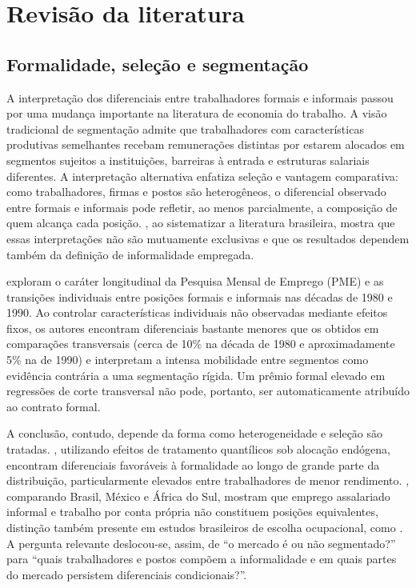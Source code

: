 \documentclass[12pt,a4paper]{article}
\begin{document}
\section{Revisão da literatura}
\label{sec:literatura}

\subsection{Formalidade, seleção e segmentação}

A interpretação dos diferenciais entre trabalhadores formais e informais passou por uma
mudança importante na literatura de economia do trabalho. A visão tradicional de
segmentação admite que trabalhadores com características produtivas semelhantes recebam
remunerações distintas por estarem alocados em segmentos sujeitos a instituições,
barreiras à entrada e estruturas salariais diferentes. A interpretação alternativa
enfatiza seleção e vantagem comparativa: como trabalhadores, firmas e postos são
heterogêneos, o diferencial observado entre formais e informais pode refletir, ao menos
parcialmente, a composição de quem alcança cada posição. \citet{ulyssea2006}, ao
sistematizar a literatura brasileira, mostra que essas interpretações não são mutuamente
exclusivas e que os resultados dependem também da definição de informalidade empregada.

\citet{curi2006} exploram o caráter longitudinal da Pesquisa Mensal de Emprego (PME) e as
transições individuais entre posições formais e informais nas décadas de 1980 e 1990. Ao
controlar características individuais não observadas mediante efeitos fixos, os autores
encontram diferenciais bastante menores que os obtidos em comparações transversais (cerca
de 10\% na década de 1980 e aproximadamente 5\% na de 1990) e interpretam a intensa
mobilidade entre segmentos como evidência contrária a uma segmentação rígida. Um prêmio
formal elevado em regressões de corte transversal não pode, portanto, ser automaticamente
atribuído ao contrato formal.

A conclusão, contudo, depende da forma como heterogeneidade e seleção são tratadas.
\citet{dalberto2018}, utilizando efeitos de tratamento quantílicos sob alocação endógena,
encontram diferenciais favoráveis à formalidade ao longo de grande parte da distribuição,
particularmente elevados entre trabalhadores de menor rendimento. \citet{bargain2011},
comparando Brasil, México e África do Sul, mostram que emprego assalariado informal e
trabalho por conta própria não constituem posições equivalentes, distinção também
presente em estudos brasileiros de escolha ocupacional, como \citet{hirata2010b}. A
pergunta relevante deslocou-se, assim, de ``o mercado é ou não segmentado?'' para
``quais trabalhadores e postos compõem a informalidade e em quais partes do mercado
persistem diferenciais condicionais?''.
\end{document}
